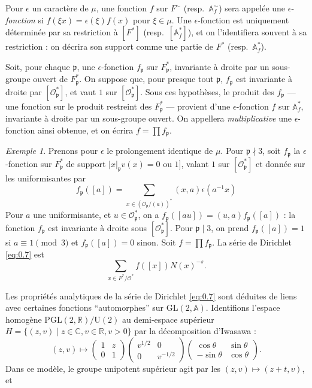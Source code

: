 \documentclass[12pt,a4paper]{article}
\theoremstyle{plain}
\theoremstyle{definition}
\theoremstyle{remark}
\newtheorem{example}[theorem]{Exemple}
\newcommand{\CC}{\mathbb{C}}
\newcommand{\RR}{\mathbb{R}}
\newcommand{\Af}{\mathbb{A}}
\newcommand{\cO}{\mathcal{O}}
\newcommand{\frakp}{\mathfrak{p}}
\providecommand{\CC}{\mathbb{C}}
\providecommand{\RR}{\mathbb{R}}
\providecommand{\cO}{\mathcal{O}}
\providecommand{\frakp}{\mathfrak{p}}
\begin{document}
Pour $\epsilon$ un caractère de $\mu$, une fonction $f$ sur $F^\sim$ (resp.\ $\Af_f^\sim$) sera appelée une $\epsilon$-\emph{fonction} si $f(\xi x) = \epsilon(\xi) f(x)$ pour $\xi \in \mu$. Une $\epsilon$-fonction est uniquement déterminée par sa restriction à $[F^*]$ (resp.\ $[\Af_f^*]$), et on l'identifiera souvent à sa restriction : on décrira son support comme une partie de $F^*$ (resp.\ $\Af_f^*$).

Soit, pour chaque $\frakp$, une $\epsilon$-fonction $f_\frakp$ sur $F_\frakp^*$, invariante à droite par un sous-groupe ouvert de $F_\frakp^*$. On suppose que, pour presque tout $\frakp$, $f_\frakp$ est invariante à droite par $[\cO_\frakp^*]$, et vaut $1$ sur $[\cO_\frakp^*]$. Sous ces hypothèses, le produit des $f_\frakp$ --- une fonction sur le produit restreint des $F_\frakp^*$ --- provient d'une $\epsilon$-fonction $f$ sur $\Af_f^*$, invariante à droite par un sous-groupe ouvert. On appellera \emph{multiplicative} une $\epsilon$-fonction ainsi obtenue, et on écrira $f = \prod f_\frakp$.

\begin{example}
Prenons pour $\epsilon$ le prolongement identique de $\mu$. Pour $\frakp \nmid 3$, soit $f_\frakp$ la $\epsilon$-fonction sur $F_\frakp^*$ de support $|x|_\frakp v(x) = 0$ ou $1]$, valant $1$ sur $[\cO_\frakp^*]$ et donnée sur les uniformisantes par
\[
f_\frakp([a]) = \sum_{x \in (\cO_\frakp/(a))^*} (x, a) \epsilon(a^{-1} x)
\]
Pour $a$ une uniformisante, et $u \in \cO_\frakp^*$, on a $f_\frakp([au]) = (u, a) f_\frakp([a])$ : la fonction $f_\frakp$ est invariante à droite sous $[\cO_\frakp^*]$. Pour $\frakp \mid 3$, on prend $f_\frakp([a]) = 1$ si $a \equiv 1 \pmod 3$ et $f_\frakp([a]) = 0$ sinon. Soit $f = \prod f_\frakp$. La série de Dirichlet \eqref{eq:0.7} est
\[
\sum_{x \in F^* / \cO^*} f([x]) N(x)^{-s}.
\]
\end{example}

Les propriétés analytiques de la série de Dirichlet \eqref{eq:0.7} sont déduites de liens avec certaines fonctions ``automorphes'' sur $\mathrm{GL}(2, \Af)$. Identifions l'espace homogène $\mathrm{PGL}(2, \RR) / \mathrm{U}(2)$ au demi-espace supérieur $H = \{(z, v) \mid z \in \CC, v \in \RR, v > 0\}$ par la décomposition d'Iwasawa :
\[
(z, v) \longmapsto \begin{pmatrix} 1 & z \\ 0 & 1 \end{pmatrix} \begin{pmatrix} v^{1/2} & 0 \\ 0 & v^{-1/2} \end{pmatrix} \begin{pmatrix} \cos\theta & \sin\theta \\ -\sin\theta & \cos\theta \end{pmatrix}.
\]
Dans ce modèle, le groupe unipotent supérieur agit par les $(z, v) \mapsto (z + t, v)$, et
\end{document}
